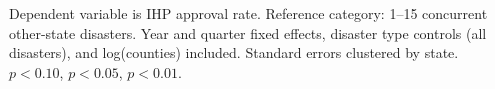 \begin{table}[htbp]
   \par \raggedright 
   Dependent variable is IHP approval rate. Reference category: 1--15 concurrent other-state disasters. Year and quarter fixed effects, disaster type controls (all disasters), and log(counties) included. Standard errors clustered by state. \sym{*} $p<0.10$, \sym{**} $p<0.05$, \sym{***} $p<0.01$.
\end{table}


